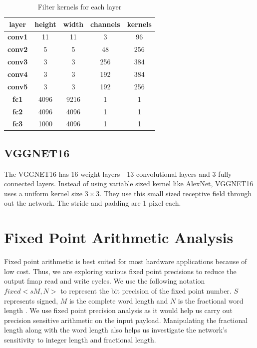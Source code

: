 \documentclass[conference]{IEEEtran}
\begin{document}
\begin{table}[H]
\centering
\caption{Filter kernels for each layer}


\label{alex_w}
\begin{tabular}{ccccc}
\hline
\textbf{layer} & \textbf{height} & \textbf{width} & \textbf{channels} & \textbf{kernels} \\ \hline
\textbf{conv1} & 11              & 11             & 3                 & 96               \\
\textbf{conv2} & 5               & 5              & 48                & 256              \\
\textbf{conv3} & 3               & 3              & 256               & 384              \\
\textbf{conv4} & 3               & 3              & 192               & 384              \\
\textbf{conv5} & 3               & 3              & 192               & 256              \\
\textbf{fc1}   & 4096            & 9216           & 1                 & 1                \\
\textbf{fc2}   & 4096            & 4096           & 1                 & 1                \\
\textbf{fc3}   & 1000            & 4096           & 1                 & 1                \\ \hline
\end{tabular}
\end{table}

\subsection{VGGNET16}
The VGGNET16 has 16 weight layers - 13 convolutional layers and 3 fully connected layers. Instead of using variable sized kernel like AlexNet, VGGNET16 uses a uniform kernel size $3 \times 3$. They use this small sized receptive field through out the network. The stride and padding are 1 pixel each. \cite{simonyan2014very}

\section{Fixed Point Arithmetic Analysis}
Fixed point arithmetic is best suited for most hardware applications because of low cost. Thus, we are exploring various fixed point precisions to reduce the output fmap read and write cycles. We use the following notation $fixed <sM,N> $ to represent the bit precision of the fixed point number. $S$ represents signed, $M$ is the complete word length and $N$ is the fractional word length . We use fixed point precision analysis as it would help us carry out precision sensitive arithmetic on the input payload. Manipulating the fractional length along with the word length also helps us investigate the network's sensitivity to integer length and fractional length. 
\end{document}
